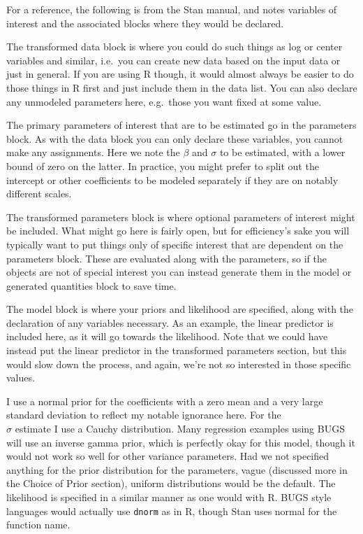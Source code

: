 \documentclass[]{book}
\begin{document}
For a reference, the following is from the Stan manual, and notes variables of interest and the associated blocks where they would be declared.

The transformed data block is where you could do such things as log or center variables and similar, i.e.~you can create new data based on the input data or just in general. If you are using R though, it would almost always be easier to do those things in R first and just include them in the data list. You can also declare any unmodeled parameters here, e.g.~those you want fixed at some value.

The primary parameters of interest that are to be estimated go in the parameters block. As with the data block you can only declare these variables, you cannot make any assignments. Here we note the \(\beta\) and \(\sigma\) to be estimated, with a lower bound of zero on the latter. In practice, you might prefer to split out the intercept or other coefficients to be modeled separately if they are on notably different scales.

The transformed parameters block is where optional parameters of interest might be included. What might go here is fairly open, but for efficiency's sake you will typically want to put things only of specific interest that are dependent on the parameters block. These are evaluated along with the parameters, so if the objects are not of special interest you can instead generate them in the model or generated quantities block to save time.

The model block is where your priors and likelihood are specified, along with the declaration of any variables necessary. As an example, the linear predictor is included here, as it will go towards the likelihood. Note that we could have instead put the linear predictor in the transformed parameters section, but this would slow down the process, and again, we're not so interested in those specific values.

I use a normal prior for the coefficients with a zero mean and a very large standard deviation to reflect my notable ignorance here. For the\\
\(\sigma\) estimate I use a Cauchy distribution. Many regression examples using BUGS will use an inverse gamma prior, which is perfectly okay for this model, though it would not work so well for other variance parameters. Had we not specified anything for the prior distribution for the parameters, vague (discussed more in the Choice of Prior section), uniform distributions would be the default. The likelihood is specified in a similar manner as one would with R. BUGS style languages would actually use \texttt{dnorm} as in R, though Stan uses normal for the function name.
\end{document}
